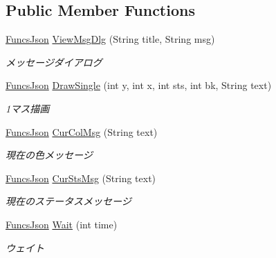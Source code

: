 \subsection*{Public Member Functions}
\begin{DoxyCompactItemize}
\item 
\hyperlink{classjp_1_1gr_1_1java__conf_1_1yuta__yoshinaga_1_1reversi_1_1model_1_1_funcs_json}{Funcs\+Json} \hyperlink{interfacejp_1_1gr_1_1java__conf_1_1yuta__yoshinaga_1_1reversi_1_1model_1_1_reversi_play_interface_afb649f3782a7eb07b78a1b47031e48aa}{View\+Msg\+Dlg} (String title, String msg)
\begin{DoxyCompactList}\small\item\em メッセージダイアログ \end{DoxyCompactList}\item 
\hyperlink{classjp_1_1gr_1_1java__conf_1_1yuta__yoshinaga_1_1reversi_1_1model_1_1_funcs_json}{Funcs\+Json} \hyperlink{interfacejp_1_1gr_1_1java__conf_1_1yuta__yoshinaga_1_1reversi_1_1model_1_1_reversi_play_interface_a21001830e58b302934372c19cd261f95}{Draw\+Single} (int y, int x, int sts, int bk, String text)
\begin{DoxyCompactList}\small\item\em 1マス描画 \end{DoxyCompactList}\item 
\hyperlink{classjp_1_1gr_1_1java__conf_1_1yuta__yoshinaga_1_1reversi_1_1model_1_1_funcs_json}{Funcs\+Json} \hyperlink{interfacejp_1_1gr_1_1java__conf_1_1yuta__yoshinaga_1_1reversi_1_1model_1_1_reversi_play_interface_a32a831288d0964d1c3a8bd58f539cfda}{Cur\+Col\+Msg} (String text)
\begin{DoxyCompactList}\small\item\em 現在の色メッセージ \end{DoxyCompactList}\item 
\hyperlink{classjp_1_1gr_1_1java__conf_1_1yuta__yoshinaga_1_1reversi_1_1model_1_1_funcs_json}{Funcs\+Json} \hyperlink{interfacejp_1_1gr_1_1java__conf_1_1yuta__yoshinaga_1_1reversi_1_1model_1_1_reversi_play_interface_ae9fe1e8ed6fca483d91b4647d8c86a83}{Cur\+Sts\+Msg} (String text)
\begin{DoxyCompactList}\small\item\em 現在のステータスメッセージ \end{DoxyCompactList}\item 
\hyperlink{classjp_1_1gr_1_1java__conf_1_1yuta__yoshinaga_1_1reversi_1_1model_1_1_funcs_json}{Funcs\+Json} \hyperlink{interfacejp_1_1gr_1_1java__conf_1_1yuta__yoshinaga_1_1reversi_1_1model_1_1_reversi_play_interface_ad89b0c606489a4a89d2778f7ad4c19dc}{Wait} (int time)
\begin{DoxyCompactList}\small\item\em ウェイト \end{DoxyCompactList}\end{DoxyCompactItemize}


